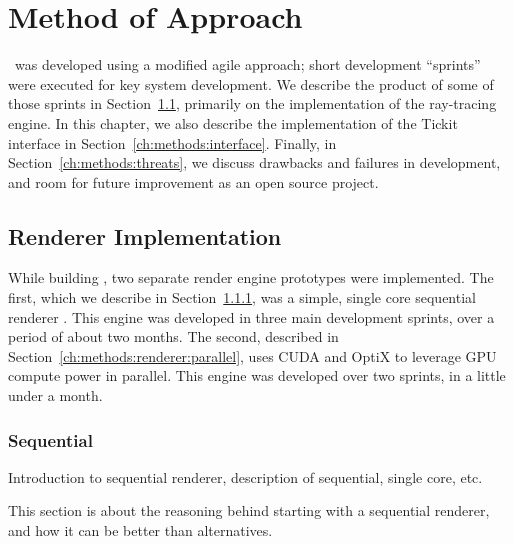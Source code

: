 %
%
%
\chapter{Method of Approach} \label{ch:methods}

\name\ was developed using a modified agile approach; short development ``sprints'' were executed for key system development.
We describe the product of some of those sprints in Section~\ref{ch:methods:renderer}, primarily on the implementation of the ray-tracing engine.
In this chapter, we also describe the implementation of the Tickit interface in Section~\ref{ch:methods:interface}.
Finally, in Section~\ref{ch:methods:threats}, we discuss drawbacks and failures in development, and room for future improvement as an open source project.


\section{Renderer Implementation} \label{ch:methods:renderer}
While building \name, two separate render engine prototypes were implemented.
The first, which we describe in Section~\ref{ch:methods:renderer:sequential}, was a simple, single core sequential renderer \cite{raytermCpuImpl}.
This engine was developed in three main development sprints, over a period of about two months.
The second, described in Section~\ref{ch:methods:renderer:parallel}, uses CUDA \cite{nvidia2011cuda} and OptiX \cite{parker2010optix} to leverage GPU compute power in parallel.
This engine was developed over two sprints, in a little under a month.


\subsection{Sequential} \label{ch:methods:renderer:sequential}

Introduction to sequential renderer, description of sequential, single core, etc.

 \label{ch:methods:renderer:sequential:motivation}

This section is about the reasoning behind starting with a sequential renderer, and how it can be better than alternatives.

 \label{ch:methods:renderer:sequential:libraries}

